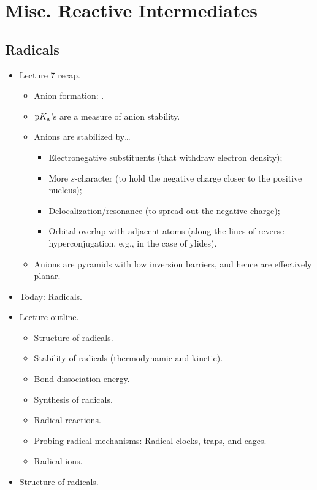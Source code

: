 \documentclass[../notes.tex]{subfiles}
\begin{document}
\chapter{Misc. Reactive Intermediates}
\section{Radicals}
\begin{itemize}
    \item {}Lecture 7 recap.
    \begin{itemize}
        \item Anion formation: .
        \item $\textup{p}K_\textup{a}$'s are a measure of anion stability.
        \item Anions are stabilized by\dots
        \begin{itemize}
            \item Electronegative substituents (that withdraw electron density);
            \item More $s$-character (to hold the negative charge closer to the positive nucleus);
            \item Delocalization/resonance (to spread out the negative charge);
            \item Orbital overlap with adjacent atoms (along the lines of reverse hyperconjugation, e.g., in the case of ylides).
        \end{itemize}
        \item Anions are pyramids with low inversion barriers, and hence are effectively planar.
    \end{itemize}
    \item Today: Radicals.
    \item Lecture outline.
    \begin{itemize}
        \item Structure of radicals.
        \item Stability of radicals (thermodynamic and kinetic).
        \item Bond dissociation energy.
        \item Synthesis of radicals.
        \item Radical reactions.
        \item Probing radical mechanisms: Radical clocks, traps, and cages.
        \item Radical ions.
    \end{itemize}
    \item Structure of radicals.

\end{itemize}
\end{document}
